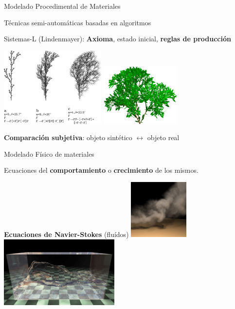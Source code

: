 \documentclass[spanish,unknownkeysallowed,10pt]{beamer}
\begin{document}
\begin{frame}{Modelado Procedimental de Materiales}

Técnicas semi-automáticas basadas en algoritmos

Sistemas-L  (Lindenmayer): \textbf{Axioma}, estado inicial, \textbf{reglas de producción}


\center

\includegraphics[width=5.3cm]{../figures/sistemalcorchete}
\includegraphics[width=4cm]{../figures/3dlsystem}

\textbf{Comparación subjetiva}: objeto sintético $\leftrightarrow$ objeto real

\end{frame}

\begin{frame}{}

\begin{block}{Modelado Físico de materiales}

Ecuaciones del \textbf{comportamiento} o \textbf{crecimiento} de los mismos.

\textbf{Ecuaciones de Navier-Stokes} (fluídos)
\center
\includegraphics[width=3cm]{../figures/smoke}
\includegraphics[width=6cm]{../figures/water}
\end{block}

\end{frame}
\end{document}
